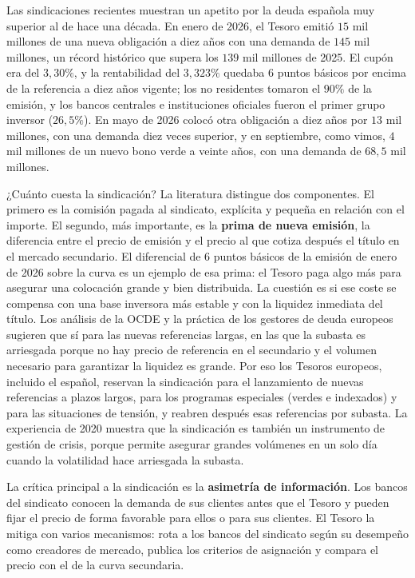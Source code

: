 \documentclass[10pt,a4paper]{article}
\begin{document}
Las sindicaciones recientes muestran un apetito por la deuda española muy superior al de hace una década. En enero de 2026, el Tesoro emitió $15$ mil millones de una nueva obligación a diez años con una demanda de $145$ mil millones, un récord histórico que supera los $139$ mil millones de 2025. El cupón era del $3,30\%$, y la rentabilidad del $3,323\%$ quedaba $6$ puntos básicos por encima de la referencia a diez años vigente; los no residentes tomaron el $90\%$ de la emisión, y los bancos centrales e instituciones oficiales fueron el primer grupo inversor ($26,5\%$). En mayo de 2026 colocó otra obligación a diez años por $13$ mil millones, con una demanda diez veces superior, y en septiembre, como vimos, $4$ mil millones de un nuevo bono verde a veinte años, con una demanda de $68,5$ mil millones.

¿Cuánto cuesta la sindicación? La literatura distingue dos componentes. El primero es la comisión pagada al sindicato, explícita y pequeña en relación con el importe. El segundo, más importante, es la \textbf{prima de nueva emisión}, la diferencia entre el precio de emisión y el precio al que cotiza después el título en el mercado secundario. El diferencial de $6$ puntos básicos de la emisión de enero de 2026 sobre la curva es un ejemplo de esa prima: el Tesoro paga algo más para asegurar una colocación grande y bien distribuida. La cuestión es si ese coste se compensa con una base inversora más estable y con la liquidez inmediata del título. Los análisis de la OCDE y la práctica de los gestores de deuda europeos sugieren que sí para las nuevas referencias largas, en las que la subasta es arriesgada porque no hay precio de referencia en el secundario y el volumen necesario para garantizar la liquidez es grande. Por eso los Tesoros europeos, incluido el español, reservan la sindicación para el lanzamiento de nuevas referencias a plazos largos, para los programas especiales (verdes e indexados) y para las situaciones de tensión, y reabren después esas referencias por subasta. La experiencia de 2020 muestra que la sindicación es también un instrumento de gestión de crisis, porque permite asegurar grandes volúmenes en un solo día cuando la volatilidad hace arriesgada la subasta.

La crítica principal a la sindicación es la \textbf{asimetría de información}. Los bancos del sindicato conocen la demanda de sus clientes antes que el Tesoro y pueden fijar el precio de forma favorable para ellos o para sus clientes. El Tesoro la mitiga con varios mecanismos: rota a los bancos del sindicato según su desempeño como creadores de mercado, publica los criterios de asignación y compara el precio con el de la curva secundaria.
\end{document}

